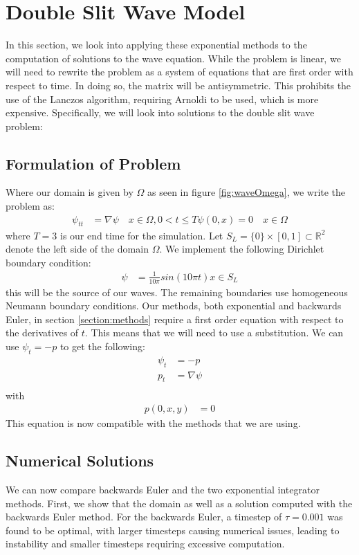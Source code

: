 \section{Double Slit Wave Model}

In this section, we look into applying these exponential methods to the computation of solutions to the wave equation.
While the problem is linear, we will need to rewrite the problem as a system of equations that are first order with respect to time.
In doing so, the matrix will be antisymmetric.
This prohibits the use of the Lanczos algorithm, requiring Arnoldi to be used, which is more expensive.
Specifically, we will look into solutions to the double slit wave problem:

\subsection{Formulation of Problem}
Where our domain is given by $\Omega$ as seen in figure \ref{fig:waveOmega}, we write the problem as:
\begin{align*}
    \psi_{tt} &= \nabla \psi \quad x \in \Omega, 0<t\leq T
    \psi(0,x) = 0 \quad x \in \Omega
\end{align*}
where $T=3$ is our end time for the simulation.
Let $S_L = \{0\} \times [0,1] \subset \mathbb{R}^2$ denote the left side of the domain $\Omega$.
We implement the following Dirichlet boundary condition:
\begin{align*}
    \psi &= \frac{1}{10\pi} sin(10\pi t) x \in S_L
\end{align*}
this will be the source of our waves.
The remaining boundaries use homogeneous Neumann boundary conditions.
Our methods, both exponential and backwards Euler, in section \ref{section:methods} require a first order equation with respect to the derivatives of $t$.
This means that we will need to use a substitution.
We can use $\psi_t = -p$ to get the following:
\begin{align*}
    \psi_t &= -p\\
    p_t &= \nabla \psi\\
\end{align*}
with
\begin{align*}
    p(0,x,y) &= 0
\end{align*}
This equation is now compatible with the methods that we are using.

\subsection{Numerical Solutions}
We can now compare backwards Euler and the two exponential integrator methods.
First, we show that the domain as well as a solution computed with the backwards Euler method.
For the backwards Euler, a timestep of $\tau = 0.001$ was found to be optimal, with larger timesteps causing numerical issues, leading to instability and smaller timesteps requiring excessive computation.

